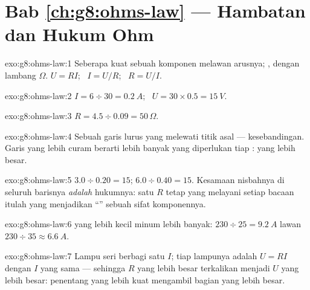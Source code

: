 \section*{Bab \ref{ch:g8:ohms-law} --- Hambatan dan Hukum Ohm}

\begin{solution}{exo:g8:ohms-law:1}
Seberapa kuat sebuah komponen melawan arusnya;  , dengan
lambang $\Omega$. $U = R I$; \ $I = U/R$; \ $R = U/I$.
\end{solution}

\begin{solution}{exo:g8:ohms-law:2}
$I = 6 \div 30 = \qty{0.2}{A}$; \ $U = 30 \times 0.5 =
\qty{15}{V}$.
\end{solution}

\begin{solution}{exo:g8:ohms-law:3}
$R = 4.5 \div 0.09 = 50\,\Omega$.
\end{solution}

\begin{solution}{exo:g8:ohms-law:4}
Sebuah garis lurus yang melewati titik asal --- kesebandingan. Garis
yang lebih curam berarti lebih banyak  yang diperlukan tiap
:  yang lebih besar.
\end{solution}

\begin{solution}{exo:g8:ohms-law:5}
$3.0 \div 0.20 = 15$; $6.0 \div 0.40 = 15$. Kesamaan nisbahnya di
seluruh barisnya \emph{adalah} hukumnya: satu $R$ tetap yang melayani
setiap bacaan itulah yang menjadikan ``'' sebuah sifat
komponennya.
\end{solution}

\begin{solution}{exo:g8:ohms-law:6}
 yang lebih kecil minum lebih banyak: $230 \div 25 =
\qty{9.2}{A}$ lawan $230 \div 35 \approx \qty{6.6}{A}$.
\end{solution}

\begin{solution}{exo:g8:ohms-law:7}
Lampu seri berbagi satu $I$;  tiap lampunya adalah $U = R I$
dengan $I$ yang sama --- sehingga $R$ yang lebih besar terkalikan
menjadi $U$ yang lebih besar: penentang yang lebih kuat mengambil
bagian yang lebih besar.
\end{solution}


